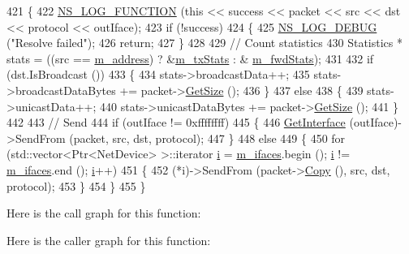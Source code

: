\begin{DoxyCode}
421 \{
422   \hyperlink{log-macros-disabled_8h_a90b90d5bad1f39cb1b64923ea94c0761}{NS\_LOG\_FUNCTION} (\textcolor{keyword}{this} << success << packet << src << dst << protocol << outIface);
423   \textcolor{keywordflow}{if} (!success)
424     \{
425       \hyperlink{group__logging_ga413f1886406d49f59a6a0a89b77b4d0a}{NS\_LOG\_DEBUG} (\textcolor{stringliteral}{"Resolve failed"});
426       \textcolor{keywordflow}{return};
427     \}
428 
429   \textcolor{comment}{// Count statistics}
430   Statistics * stats = ((src == \hyperlink{classns3_1_1MeshPointDevice_abdd42cdf967d3b75cc32e20f74e10c51}{m\_address}) ? &\hyperlink{classns3_1_1MeshPointDevice_abbd06f2b215c772004661d6bdb156a31}{m\_txStats} : &
      \hyperlink{classns3_1_1MeshPointDevice_a7e408ac2b047d923dffaf0945d28f80f}{m\_fwdStats});
431 
432   \textcolor{keywordflow}{if} (dst.IsBroadcast ())
433     \{
434       stats->broadcastData++;
435       stats->broadcastDataBytes += packet->\hyperlink{classns3_1_1Packet_a462855c9929954d4301a4edfe55f4f1c}{GetSize} ();
436     \}
437   \textcolor{keywordflow}{else}
438     \{
439       stats->unicastData++;
440       stats->unicastDataBytes += packet->\hyperlink{classns3_1_1Packet_a462855c9929954d4301a4edfe55f4f1c}{GetSize} ();
441     \}
442 
443   \textcolor{comment}{// Send}
444   \textcolor{keywordflow}{if} (outIface != 0xffffffff)
445     \{
446       \hyperlink{classns3_1_1MeshPointDevice_a713a8775a919a65821d588e22d3a69dd}{GetInterface} (outIface)->SendFrom (packet, src, dst, protocol);
447     \}
448   \textcolor{keywordflow}{else}
449     \{
450       \textcolor{keywordflow}{for} (std::vector<Ptr<NetDevice> >::iterator \hyperlink{bernuolliDistribution_8m_a6f6ccfcf58b31cb6412107d9d5281426}{i} = \hyperlink{classns3_1_1MeshPointDevice_a651ebd5660f380c261cd9a055a95805d}{m\_ifaces}.begin (); 
      \hyperlink{bernuolliDistribution_8m_a6f6ccfcf58b31cb6412107d9d5281426}{i} != \hyperlink{classns3_1_1MeshPointDevice_a651ebd5660f380c261cd9a055a95805d}{m\_ifaces}.end (); \hyperlink{bernuolliDistribution_8m_a6f6ccfcf58b31cb6412107d9d5281426}{i}++)
451         \{
452           (*i)->SendFrom (packet->\hyperlink{classns3_1_1Packet_a5d5c70802a5f77fc5f0001e0cfc1898b}{Copy} (), src, dst, protocol);
453         \}
454     \}
455 \}
\end{DoxyCode}


Here is the call graph for this function\+:




Here is the caller graph for this function\+:


